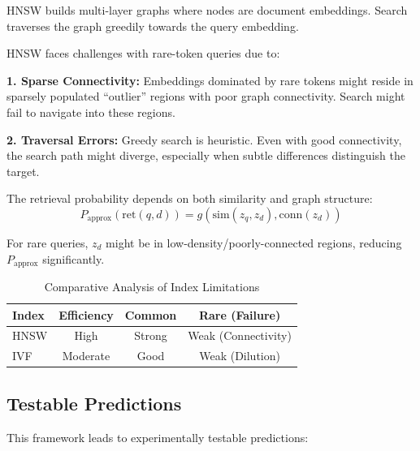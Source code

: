 \documentclass[conference,anonymous]{IEEEtran}
\begin{document}
HNSW \cite{malkov2019efficient} builds multi-layer graphs where nodes are document embeddings. Search traverses the graph greedily towards the query embedding.

HNSW faces challenges with rare-token queries due to:

\textbf{1. Sparse Connectivity:} Embeddings dominated by rare tokens might reside in sparsely populated ``outlier'' regions with poor graph connectivity. Search might fail to navigate into these regions.

\textbf{2. Traversal Errors:} Greedy search is heuristic. Even with good connectivity, the search path might diverge, especially when subtle differences distinguish the target.

The retrieval probability depends on both similarity and graph structure:
\begin{equation}
P_{\text{approx}}(\text{ret}(q, d)) = g(\text{sim}(z_q, z_d), \text{conn}(z_d))
\label{eq:hnsw_retrieval_prob}
\end{equation}

For rare queries, $z_d$ might be in low-density/poorly-connected regions, reducing $P_{\text{approx}}$ significantly.

\begin{table}[t]
\centering
\small
\caption{Comparative Analysis of Index Limitations}
\label{tab:comparison_revised}
\begin{tabular}{lccc}
\toprule
\textbf{Index} & \textbf{Efficiency} & \textbf{Common} & \textbf{Rare (Failure)} \\
\midrule
HNSW & High & Strong & Weak (Connectivity) \\
IVF & Moderate & Good & Weak (Dilution) \\
\bottomrule
\end{tabular}
\end{table}

\subsection{Testable Predictions}

This framework leads to experimentally testable predictions:
\end{document}
